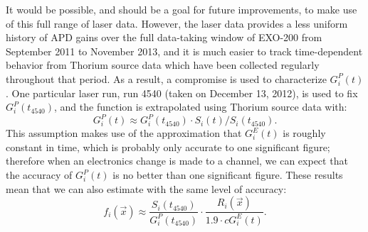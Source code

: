It would be possible, and should be a goal for future improvements, to make use of this full range of laser data.  However, the laser data provides a less uniform history of APD gains over the full data-taking window of EXO-200 from September 2011 to November 2013, and it is much easier to track time-dependent behavior from Thorium source data which have been collected regularly throughout that period.  As a result, a compromise is used to characterize $G^P_i(t)$.  One particular laser run, run 4540 (taken on December 13, 2012), is used to fix $G^P_i(t_{4540})$, and the function is extrapolated using Thorium source data with:
\[G^P_i(t) \approx G^P_i(t_{4540}) \cdot S_i(t)/S_i(t_{4540}).\]
This assumption makes use of the approximation that $G^E_i(t)$ is roughly constant in time, which is probably only accurate to one significant figure; therefore when an electronics change is made to a channel, we can expect that the accuracy of $G^P_i(t)$ is no better than one significant figure.  These results mean that we can also estimate with the same level of accuracy:
\[f_i(\vec{x}) \approx \frac{S_i(t_{4540})}{G^P_i(t_{4540})} \cdot \frac{R_i(\vec{x})}{1.9 \cdot c G^E_i(t)}.\]

